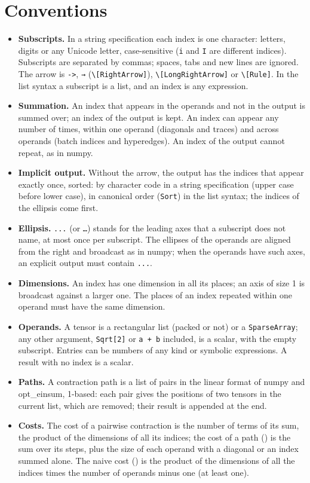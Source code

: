 \documentclass[11pt,a4paper]{article}
\begin{document}
\section{Conventions}
\begin{itemize}
\item \textbf{Subscripts.} In a string specification each index is one character: letters, digits or any Unicode letter,
  case-sensitive (\texttt{i} and \texttt{I} are different indices). Subscripts are separated by commas; spaces, tabs and new
  lines are ignored. The arrow is \texttt{->}, \texttt{→} (\texttt{\textbackslash[RightArrow]}), \texttt{\textbackslash[LongRightArrow]}
  or \texttt{\textbackslash[Rule]}. In the list syntax a subscript is a list, and an index is any expression.
\item \textbf{Summation.} An index that appears in the operands and not in the output is summed over; an index of the output
  is kept. An index can appear any number of times, within one operand (diagonals and traces) and across operands (batch
  indices and hyperedges). An index of the output cannot repeat, as in numpy.
\item \textbf{Implicit output.} Without the arrow, the output has the indices that appear exactly once, sorted: by character
  code in a string specification (upper case before lower case), in canonical order (\texttt{Sort}) in the list syntax;
  the indices of the ellipsis come first.
\item \textbf{Ellipsis.} \texttt{...} (or \texttt{…}) stands for the leading axes that a subscript does not name, at most once
  per subscript. The ellipses of the operands are aligned from the right and broadcast as in numpy; when the operands have
  such axes, an explicit output must contain \texttt{...}.
\item \textbf{Dimensions.} An index has one dimension in all its places; an axis of size 1 is broadcast against a larger
  one. The places of an index repeated within one operand must have the same dimension.
\item \textbf{Operands.} A tensor is a rectangular list (packed or not) or a \texttt{SparseArray}; any other argument,
  \texttt{Sqrt[2]} or \texttt{a + b} included, is a scalar, with the empty subscript. Entries can be numbers of any kind or
  symbolic expressions. A result with no index is a scalar.
\item \textbf{Paths.} A contraction path is a list of pairs in the linear format of numpy and opt\_einsum, 1-based: each pair
  gives the positions of two tensors in the current list, which are removed; their result is appended at the end.
\item \textbf{Costs.} The cost of a pairwise contraction is the number of terms of its sum, the product of the dimensions of
  all its indices; the cost of a path () is the sum over its steps, plus the size of each operand with a
  diagonal or an index summed alone. The naive cost () is the product of the dimensions of all the indices
  times the number of operands minus one (at least one).
\end{itemize}
\end{document}
